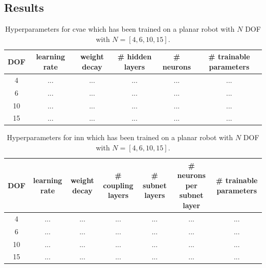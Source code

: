 \documentclass[conference]{IEEEtran}
\begin{document}
\subsection*{Results}

\begin{table}[h]
\centering
\begin{tabular}{|c|c|c|c|c|c|}
\hline
 DOF & learning rate & weight decay & \# hidden layers & \# neurons & \# trainable parameters\\
 \hline
 4  & ...& ... & ... & ... & ...\\
 6  & ... & ...& ... & ... & ...\\
 10  & ... & ... & ... & ... & ...\\
 15  & ... & ... & ... & ... & ...\\
 \hline
\end{tabular}
\vspace{5pt}
\caption{\label{tab:results}  Hyperparameters for cvae which has been trained on a planar robot with $N$ DOF with $N=[4, 6, 10, 15]$.}
\end{table}

\begin{table}[h]
\centering
\begin{tabular}{|c|c|c|c|c|c|c|}
\hline
 DOF & learning rate & weight decay & \# coupling layers & \# subnet layers & \# neurons per subnet layer &  \# trainable parameters\\
 \hline
 4  & ...& ... & ... & ... & ... & ...\\
 6  & ... & ...& ... & ... & ... & ...\\
 10  & ... & ... & ... & ... & ... & ...\\
 15  & ... & ... & ... & ... & ... & ...\\
 \hline
\end{tabular}
\vspace{5pt}
\caption{\label{tab:results}  Hyperparameters for inn which has been trained on a planar robot with $N$ DOF with $N=[4, 6, 10, 15]$.}
\end{table}


\end{document}
